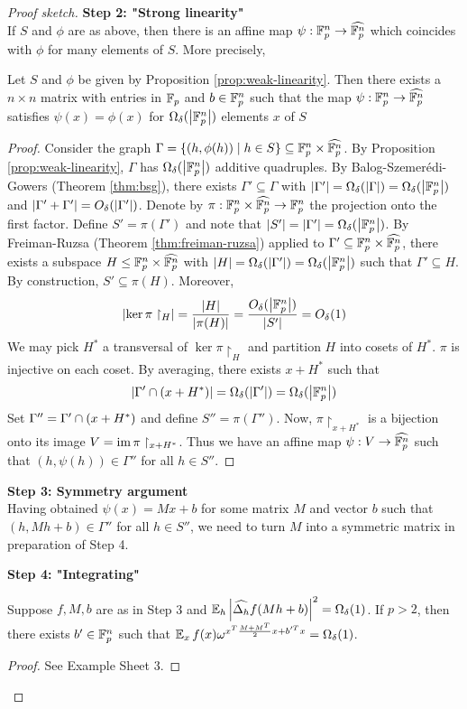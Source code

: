 \documentclass{article}
\begin{document}
\begin{proof}[Proof sketch]
  {\bf Step 2: "Strong linearity"} \\
  If $S$ and $\phi$ are as above, then there is an affine map $\psi : \mathbb F_p^n \to \widehat{\mathbb F_p^n}$ which coincides with $\phi$ for many elements of $S$. More precisely,
  \begin{prop}
    Let $S$ and $\phi$ be given by Proposition \ref{prop:weak-linearity}. Then there exists a $n \times n$ matrix with entries in $\mathbb F_p$ and $b \in \mathbb F_p^n$ such that the map $\psi : \mathbb F_p^n \to \widehat{\mathbb F_p^n}$ satisfies $\psi(x) = \phi(x)$ for $\Omega_\delta(\left\lvert \mathbb F_p^n\right\rvert)$ elements $x$ of $S$
  \end{prop}
  \begin{proof}
    Consider the graph $\Gamma = \{(h, \phi(h)) \mid h \in S\} \subseteq \mathbb F_p^n \times \widehat{\mathbb F_p^n}$. By Proposition \ref{prop:weak-linearity}, $\Gamma$ has $\Omega_\delta(\left\lvert \mathbb F_p^n\right\rvert)$ additive quadruples. By Balog-Szemerédi-Gowers (Theorem \ref{thm:bsg}), there exists $\Gamma' \subseteq \Gamma$ with $\left\lvert \Gamma'\right\rvert = \Omega_\delta(\left\lvert \Gamma\right\rvert) = \Omega_\delta(\left\lvert \mathbb F_p^n\right\rvert)$ and $\left\lvert \Gamma' + \Gamma'\right\rvert = O_\delta(\left\lvert \Gamma'\right\rvert)$. Denote by $\pi : \mathbb F_p^n \times \widehat{\mathbb F_p^n} \to \mathbb F_p^n$ the projection onto the first factor. Define $S' = \pi(\Gamma')$ and note that $\left\lvert S'\right\rvert = \left\lvert \Gamma'\right\rvert = \Omega_\delta(\left\lvert \mathbb F_p^n\right\rvert)$. By Freiman-Ruzsa (Theorem \ref{thm:freiman-ruzsa}) applied to $\Gamma' \subseteq \mathbb F_p^n \times \widehat{\mathbb F_p^n}$, there exists a subspace $H \le \mathbb F_p^n \times \widehat{\mathbb F_p^n}$ with $\left\lvert H\right\rvert = \Omega_\delta(\left\lvert \Gamma'\right\rvert) = \Omega_\delta(\left\lvert \mathbb F_p^n\right\rvert)$ such that $\Gamma' \subseteq H$. By construction, $S' \subseteq \pi(H)$. Moreover,
    $$\left\lvert \ker \pi\restriction_H\right\rvert = \frac{\left\lvert H\right\rvert}{\left\lvert \pi(H)\right\rvert} = \frac{O_\delta(\left\lvert \mathbb F_p^n\right\rvert)}{\left\lvert S'\right\rvert} = O_\delta(1)$$
    We may pick $H^*$ a transversal of $\ker \pi\restriction_H$ and partition $H$ into cosets of $H^*$. $\pi$ is injective on each coset. By averaging, there exists $x + H^*$ such that
    $$\left\lvert \Gamma' \cap (x + H^*)\right\rvert = \Omega_\delta(\left\lvert \Gamma'\right\rvert) = \Omega_\delta(\left\lvert \mathbb F_p^n\right\rvert)$$
    Set $\Gamma'' = \Gamma' \cap (x + H^*)$ and define $S'' = \pi(\Gamma'')$. Now, $\pi\restriction_{x + H^*}$ is a bijection onto its image $V = \operatorname{im} \pi\restriction_{x + H^*}$. Thus we have an affine map $\psi : V \to \widehat{\mathbb F_p^n}$ such that $(h, \psi(h)) \in \Gamma''$ for all $h \in S''$.
  \end{proof}
  
  {\bf Step 3: Symmetry argument} \\
  Having obtained $\psi(x) = Mx + b$ for some matrix $M$ and vector $b$ such that $(h, Mh + b) \in \Gamma''$ for all $h \in S''$, we need to turn $M$ into a symmetric matrix in preparation of Step 4.

  {\bf Step 4: "Integrating"}
  \begin{prop}
    Suppose $f, M, b$ are as in Step 3 and $\E_h \abs{\widehat{\Delta_h}f(Mh + b)}^2 = \Omega_\delta(1)$. If $p > 2$, then there exists $b' \in \mathbb F_p^n$ such that $\E_x f(x) \omega^{x^T\frac{M + M^T}2 x + b'^T x} = \Omega_\delta(1)$.
  \end{prop}
  \begin{proof}
    See Example Sheet 3.
  \end{proof}
\end{proof}
\end{document}
